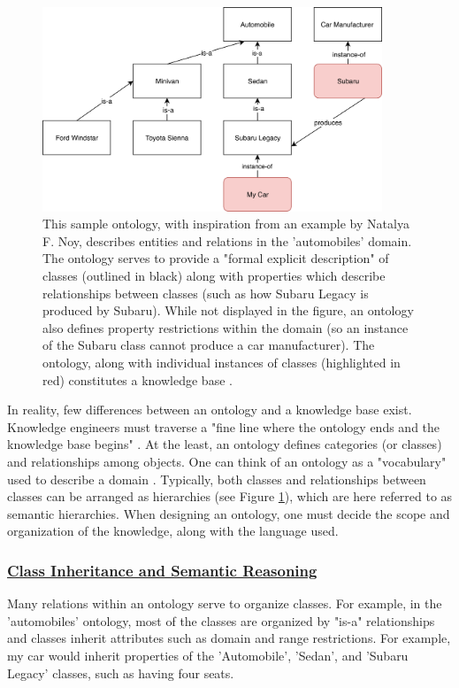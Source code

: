 \documentclass{article}
\begin{document}
\begin{figure}[h]
\centering
\includegraphics[width=4in]{sample_ontology}
\caption[Sample Ontology]{This sample ontology, with inspiration from an example by Natalya F. Noy, describes entities and relations in the 'automobiles' domain. The ontology serves to provide a "formal explicit description" of classes (outlined in black) along with properties which describe relationships between classes (such as how Subaru Legacy is produced by Subaru). While not displayed in the figure, an ontology also defines property restrictions within the domain (so an instance of the Subaru class cannot produce a car manufacturer). The ontology, along with individual instances of classes (highlighted in red) constitutes a knowledge base \cite{noy2001ontology}. }
\label{fig:sample_ontology}
\end{figure}

In reality, few differences between an ontology and a knowledge base exist. Knowledge engineers must traverse a "fine line where the ontology ends and the knowledge base begins" \cite{noy2001ontology}. At the least, an ontology defines categories (or classes) and relationships among objects. One can think of an ontology as a "vocabulary" used to describe a domain \cite[308]{russell2016artificial}. Typically, both classes and relationships between classes can be arranged as hierarchies  (see Figure \ref{fig:sample_ontology}), which are here referred to as semantic hierarchies. When designing an ontology, one must decide the scope and organization of the knowledge, along with the language used. 

\subsubsection{\underline{Class Inheritance and Semantic Reasoning}}

Many relations within an ontology serve to organize classes. For example, in the 'automobiles' ontology, most of the classes are organized by "is-a" relationships and classes inherit attributes such as domain and range restrictions. For example, my car would inherit properties of the 'Automobile', 'Sedan', and 'Subaru Legacy' classes, such as having four seats. 
\end{document}
